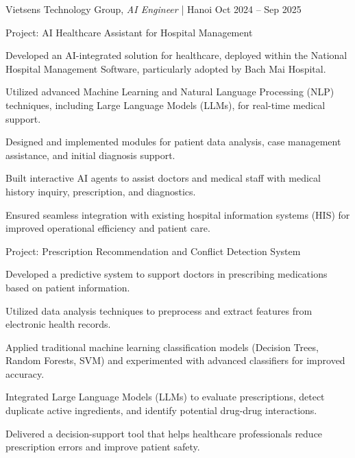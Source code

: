 \vspace{8pt}

\begin{cventries2}

  \cventrynew
  {Vietsens Technology Group, \textnormal{\textit{AI Engineer} | Hanoi}}
  {Oct 2024 -- Sep 2025}
  {}

\end{cventries2}

\vspace{-10pt}

\begin{cventries}

  \cventry
    {Project: AI Healthcare Assistant for Hospital Management}
    {}
    {
      \begin{cvitems}
        \item {Developed an AI-integrated solution for healthcare, deployed within the National Hospital Management Software, particularly adopted by Bach Mai Hospital.}
        \item {Utilized advanced Machine Learning and Natural Language Processing (NLP) techniques, including Large Language Models (LLMs), for real-time medical support.}
        \item {Designed and implemented modules for patient data analysis, case management assistance, and initial diagnosis support.}
        \item {Built interactive AI agents to assist doctors and medical staff with medical history inquiry, prescription, and diagnostics.}
        \item {Ensured seamless integration with existing hospital information systems (HIS) for improved operational efficiency and patient care.}
      \end{cvitems}
    }

\vspace{8pt}

  \cventry
    {Project: Prescription Recommendation and Conflict Detection System}
    {}
    {
      \begin{cvitems}
        \item {Developed a predictive system to support doctors in prescribing medications based on patient information.}
        \item {Utilized data analysis techniques to preprocess and extract features from electronic health records.}
        \item {Applied traditional machine learning classification models (Decision Trees, Random Forests, SVM) and experimented with advanced classifiers for improved accuracy.}
        \item {Integrated Large Language Models (LLMs) to evaluate prescriptions, detect duplicate active ingredients, and identify potential drug-drug interactions.}
        \item {Delivered a decision-support tool that helps healthcare professionals reduce prescription errors and improve patient safety.}
      \end{cvitems}
    }

\end{cventries}

